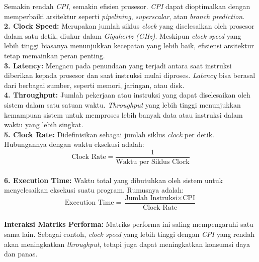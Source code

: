 \documentclass[12pt]{article}
\begin{document}
Semakin rendah \textit{CPI}, semakin efisien prosesor. \textit{CPI} dapat dioptimalkan dengan memperbaiki arsitektur seperti \textit{pipelining}, \textit{superscalar}, atau \textit{branch prediction}.\\

\textbf{2. Clock Speed:} Merupakan jumlah siklus \textit{clock} yang diselesaikan oleh prosesor dalam satu detik, diukur dalam \textit{Gigahertz (GHz)}. Meskipun \textit{clock speed} yang lebih tinggi biasanya menunjukkan kecepatan yang lebih baik, efisiensi arsitektur tetap memainkan peran penting.\\

\textbf{3. Latency:} Mengacu pada penundaan yang terjadi antara saat instruksi diberikan kepada prosesor dan saat instruksi mulai diproses. \textit{Latency} bisa berasal dari berbagai sumber, seperti memori, jaringan, atau disk.\\

\textbf{4. Throughput:} Jumlah pekerjaan atau instruksi yang dapat diselesaikan oleh sistem dalam satu satuan waktu. \textit{Throughput} yang lebih tinggi menunjukkan kemampuan sistem untuk memproses lebih banyak data atau instruksi dalam waktu yang lebih singkat.\\

\textbf{5. Clock Rate:} Didefinisikan sebagai jumlah siklus \textit{clock} per detik. Hubungannya dengan waktu eksekusi adalah:\\

\begin{equation}
\text{Clock Rate} = \frac{1}{\text{Waktu per Siklus Clock}}
\end{equation}\\

\textbf{6. Execution Time:} Waktu total yang dibutuhkan oleh sistem untuk menyelesaikan eksekusi suatu program. Rumusnya adalah:\\

\begin{equation}
\text{Execution Time} = \frac{\text{Jumlah Instruksi} \times \text{CPI}}{\text{Clock Rate}}
\end{equation}\\

\textbf{Interaksi Matriks Performa:} Matriks performa ini saling mempengaruhi satu sama lain. Sebagai contoh, \textit{clock speed} yang lebih tinggi dengan \textit{CPI} yang rendah akan meningkatkan \textit{throughput}, tetapi juga dapat meningkatkan konsumsi daya dan panas.\\
\end{document}

